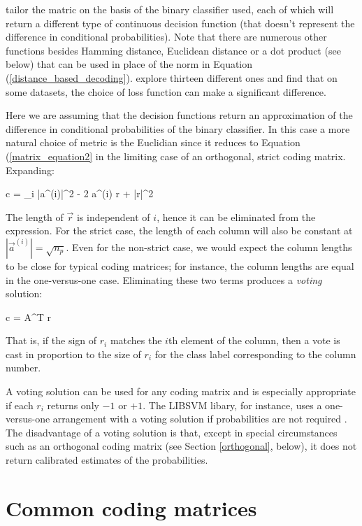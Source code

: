 \citet{Allwein_etal2000} 
tailor the matric on the basis of the binary classifier used, each of which
will return a different type of continuous decision function 
(that doesn't represent the difference in conditional probabilities).
Note that there are numerous other functions besides Hamming distance,
Euclidean distance or a dot product (see below) that can be used in place of the 
norm in Equation (\ref{distance_based_decoding}).
\citet{Escalera_etal2010} explore thirteen different ones and find that on
some datasets, the choice of loss function can make a significant difference.

Here we are assuming that the decision functions return an approximation of the 
difference in conditional probabilities of the binary classifier.
In this case a more natural choice of metric is the Euclidian
since it reduces to Equation (\ref{matrix_equation2} in the limiting
case of an orthogonal, strict coding matrix. Expanding:
\begin{eqnnon}
	c = \arg \min_i \left \lbrace |\vec a^{(i)}|^2 - 2 \vec a^{(i)} \cdot \vec r + |\vec r|^2 \right \rbrace
\end{eqnnon}
The length of $\vec r$ is independent of $i$, hence it can be eliminated from the expression.
For the strict case, the length of each column will also be constant at $|\vec a^{(i)}|=\sqrt{n_p}$.
Even for the non-strict case, we would expect the column lengths to be close for typical coding 
matrices; for instance, the column lengths are equal in the one-versus-one case.
Eliminating these two terms produces a {\it voting} solution:
\begin{eqnnon}
	c = \arg \max A^T \vec r
\end{eqnnon}
That is, if the sign of $r_i$ matches the $i$th element of the column, then a vote is cast 
in proportion to the size of $r_i$ for the class label corresponding to the column number.

A voting solution can be used for any coding matrix and 
is especially appropriate if each $r_i$ returns only $-1$ or $+1$.  
The LIBSVM libary, for instance, uses a one-versus-one arrangement with a voting
solution if probabilities are not required \citep{Chang_Lin2011}.
The disadvantage of a voting solution is
that, except in special circumstances such as an orthogonal coding matrix
(see Section \ref{orthogonal}, below), it does not return calibrated
estimates of the probabilities.

\section{Common coding matrices}

